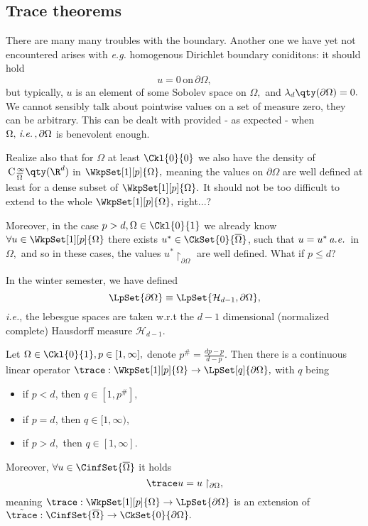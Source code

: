 \subsection{Trace theorems}
\label{sec:traces}

There are many many troubles with the boundary. Another one we have yet not encountered arises with \textit{e.g.} homogenous Dirichlet boundary coniditons: it should hold
\[
	u = 0 \, \text{on} \, \partial \Omega,
\]
but typically, $u$ is an element of some Sobolev space on $\Omega,$ and $\lambda_{d}\qty(\partial \Omega) = 0.$ We cannot sensibly talk about pointwise values on a set of measure zero, they can be arbitrary. This can be dealt with provided - as expected - when $\Omega, \, \text{\textit{i.e.}} \,, \partial \Omega$ is benevolent enough. 

Realize also that for $\Omega$ at least $\Ckl{0}{0}$ we also have the density of $\, \text{C} \,^{\infty}_{\overline{\Omega}}\qty(\R^{d})$ in $\WkpSet[1][p]{\Omega},$ meaning the values on $\partial \Omega$ are well defined at least for a dense subset of $\WkpSet[1][p]{\Omega}.$ It should not be too difficult to extend to the whole $\WkpSet[1][p]{\Omega},$ right...?

Moreover, in the case $p>d, \Omega \in \Ckl{0}{1}$ we already know $\forall u \in \WkpSet[1][p]{\Omega}$ there exists $u^{*} \in \CkSet{0}{\overline{\Omega}}$, such that $u = u^{*} \, \text{\textit{a.e.}} \,$ in $\Omega,$ and so in these cases, the values $u^{*}\restriction_{\partial \Omega}$ are well defined. What if $p \leq d$?

\begin{remark}
	In the winter semester, we have defined
	\[
		\LpSet{\partial \Omega} \equiv \LpSet{\mathcal{H}_{d-1}, \partial \Omega},
	\]
	\textit{i.e.}, the lebesgue spaces are taken w.r.t the $d-1$ dimensional (normalized complete) Hausdorff measure $\mathcal{H}_{d-1}.$
\end{remark}
\begin{theorem}
	Let $\Omega \in \Ckl{0}{1}, p \in [1,\infty],$ denote $p^{\#} = \frac{dp-p}{d-p}.$ Then there is a continuous linear operator $\trace: \WkpSet[1][p]{\Omega} \to \LpSet[q]{\partial \Omega},$ with $q$ being

	\begin{itemize}
		\item if $p<d$, then $q \in [1, p^{\#}],$
		\item if $p=d$, then $q \in [1, \infty)$,
		\item if $p>d,$ then $q \in [1, \infty]$.
	\end{itemize}
	Moreover, $\forall u \in \CinfSet{\overline{\Omega}}$ it holds
	\[
		\trace u = u\restriction_{\partial \Omega},
	\]
	meaning $\trace: \WkpSet[1][p]{\Omega} \to \LpSet{\partial \Omega}$ is an extension of $\tilde{\trace}: \CinfSet{\overline{\Omega}} \to \CkSet{0}{\partial \Omega}.$
\end{theorem}

